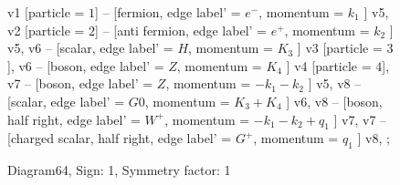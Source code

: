 \documentclass{revtex4}
\begin{document}
\begin{figure}[!htb]
\begin{center}
{    %
v1 [particle = \(1\)] -- [fermion, edge label' = \(e^{-}\), momentum = \(k_{1}\) ] v5, 
v2 [particle = \(2\)] -- [anti fermion, edge label' = \(e^{+}\), momentum = \(k_{2}\) ] v5, 
v6 -- [scalar, edge label' = \(H\), momentum = \(K_{3}\) ] v3 [particle = \(3\)], 
v6 -- [boson, edge label' = \(Z\), momentum = \(K_{4}\) ] v4 [particle = \(4\)], 
v7 -- [boson, edge label' = \(Z\), momentum = \(-k_{1} - k_{2}\) ] v5, 
v8 -- [scalar, edge label' = \(G0\), momentum = \(K_{3} + K_{4}\) ] v6, 
v8 -- [boson, half right, edge label' = \(W^{+}\), momentum = \(-k_{1} - k_{2} + q_{1}\) ] v7, 
v7 -- [charged scalar, half right, edge label' = \(G^{+}\), momentum = \(q_{1}\) ] v8, 
};
\end{center}
\caption{Diagram64, Sign: 1, Symmetry factor: 1}
\end{figure}
\newpage
\end{document}
